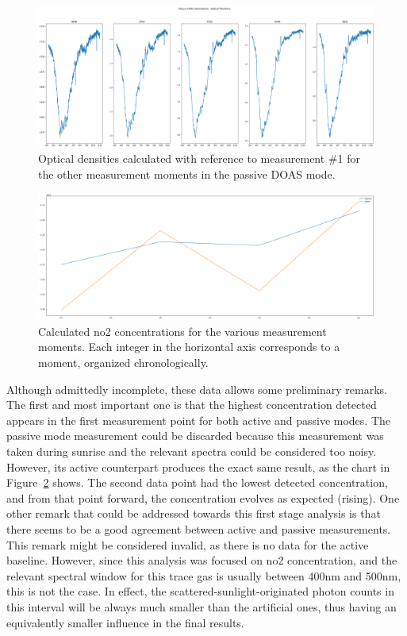 \begin{figure}[htpb]
    \centering
    \includegraphics[width=0.8\linewidth]{img/png/tau_passiveDOAS.png}
    \caption{Optical densities calculated with reference to measurement
    \#1 for the other measurement moments in the passive DOAS mode.} 
    \label{fig:passive_optical_densities}
\end{figure}

\begin{figure}[htpb]
    \centering
    \includegraphics[width=0.8\linewidth]{img/png/calculatedConcentrations.png}
    \caption{Calculated \gls{no2} concentrations for the various
    measurement moments. Each integer in the horizontal axis corresponds
    to a moment, organized chronologically.}
    \label{fig:calculated_concentration}
\end{figure}

Although admittedly incomplete, these data allows some preliminary
remarks. The first and most important one is that the highest
concentration detected appears in the first measurement point for both
active and passive modes. The passive mode measurement could be
discarded because this measurement was taken during sunrise and the
relevant spectra could be considered too noisy. However, its active
counterpart produces the exact same result, as the chart in
Figure~\ref{fig:calculated_concentration} shows. The second data point
had the lowest detected concentration, and from that point forward, the
concentration evolves as expected (rising). One other remark that could
be addressed towards this first stage analysis is that there seems to be
a good agreement between active and passive measurements. This remark
might be considered invalid, as there is no data for the active
baseline. However, since this analysis was focused on \gls{no2}
concentration, and the relevant spectral window for this trace gas is
usually between 400nm and 500nm, this is not the case. In effect, the
scattered-sunlight-originated photon counts in this interval will be
always much smaller than the artificial ones, thus having an
equivalently smaller influence in the final results. 

